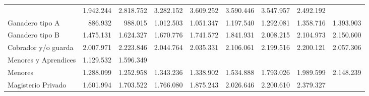 \begin{tabular}{lllllllll}
  \multicolumn{1}{|r}{} &
  \multicolumn{1}{r}{1.942.244} &
  \multicolumn{1}{r}{2.818.752} &
  \multicolumn{1}{r}{3.282.152} &
  \multicolumn{1}{r}{3.609.252} &
  \multicolumn{1}{r}{3.590.446} &
  \multicolumn{1}{r}{3.547.957} &
  \multicolumn{1}{r}{2.492.192} \\
\multicolumn{1}{l}{\hspace{1em}Ganadero tipo A} &
  \multicolumn{1}{|r}{886.932} &
  \multicolumn{1}{r}{988.015} &
  \multicolumn{1}{r}{1.012.503} &
  \multicolumn{1}{r}{1.051.347} &
  \multicolumn{1}{r}{1.197.540} &
  \multicolumn{1}{r}{1.292.081} &
  \multicolumn{1}{r}{1.358.716} &
  \multicolumn{1}{r}{1.393.903} \\
\multicolumn{1}{l}{\hspace{1em}Ganadero tipo B} &
  \multicolumn{1}{|r}{1.475.131} &
  \multicolumn{1}{r}{1.624.327} &
  \multicolumn{1}{r}{1.670.776} &
  \multicolumn{1}{r}{1.741.572} &
  \multicolumn{1}{r}{1.841.931} &
  \multicolumn{1}{r}{2.008.215} &
  \multicolumn{1}{r}{2.104.973} &
  \multicolumn{1}{r}{2.150.600} \\
\multicolumn{1}{l}{\hspace{1em}Cobrador y/o guarda} &
  \multicolumn{1}{|r}{2.007.971} &
  \multicolumn{1}{r}{2.223.846} &
  \multicolumn{1}{r}{2.044.764} &
  \multicolumn{1}{r}{2.035.331} &
  \multicolumn{1}{r}{2.106.061} &
  \multicolumn{1}{r}{2.199.516} &
  \multicolumn{1}{r}{2.200.121} &
  \multicolumn{1}{r}{2.057.306} \\
\multicolumn{1}{l}{\hspace{1em}Menores y Aprendices} &
  \multicolumn{1}{|r}{1.129.532} &
  \multicolumn{1}{r}{1.596.349} &
  \multicolumn{1}{r}{} &
  \multicolumn{1}{r}{} &
  \multicolumn{1}{r}{} &
  \multicolumn{1}{r}{} &
  \multicolumn{1}{r}{} &
  \multicolumn{1}{r}{} \\
\multicolumn{1}{l}{\hspace{1em}Menores} &
  \multicolumn{1}{|r}{1.288.099} &
  \multicolumn{1}{r}{1.252.958} &
  \multicolumn{1}{r}{1.343.236} &
  \multicolumn{1}{r}{1.338.902} &
  \multicolumn{1}{r}{1.534.888} &
  \multicolumn{1}{r}{1.793.026} &
  \multicolumn{1}{r}{1.989.599} &
  \multicolumn{1}{r}{2.148.239} \\
\multicolumn{1}{l}{\hspace{1em}Magisterio Privado} &
  \multicolumn{1}{|r}{1.601.994} &
  \multicolumn{1}{r}{1.703.522} &
  \multicolumn{1}{r}{1.766.080} &
  \multicolumn{1}{r}{1.875.243} &
  \multicolumn{1}{r}{2.026.646} &
  \multicolumn{1}{r}{2.200.610} &
  \multicolumn{1}{r}{2.379.327} &

\end{tabular}
